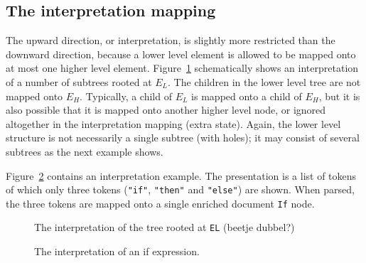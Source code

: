 %																
\subsection{The interpretation mapping}

The upward direction, or interpretation, is slightly more restricted than the downward direction, because a lower level element is allowed to be mapped onto at most one higher level element.  Figure~\ref{elementInterpretation} schematically shows an interpretation of a number of subtrees rooted at $E_L$. The children in the lower level tree are not mapped onto $E_H$. Typically, a child of $E_L$ is mapped onto a child of $E_H$, but it is also possible that it is mapped onto another higher level node, or ignored altogether in the interpretation mapping (extra state).  Again, the lower level structure is not necessarily a single subtree (with holes); it may consist of several subtrees as the next example shows.

Figure~\ref{interpretExample} contains an interpretation example. The presentation is a list of tokens of which only three tokens (\verb|"if"|, \verb|"then"| and \verb|"else"|) are shown. When parsed, the three tokens are mapped onto a single enriched document \verb|If| node. 

\begin{figure}
\begin{center}
\begin{center}
%
%
\end{center}
\caption{The interpretation of the tree rooted at {\tt EL} (beetje dubbel?)}\label{elementInterpretation} 
\end{center}
\end{figure}


\toHere     %

\begin{figure}
\begin{center}
\begin{center}
\end{center}
\caption{The interpretation of an if expression.}\label{interpretExample} 
\end{center}
\end{figure}

